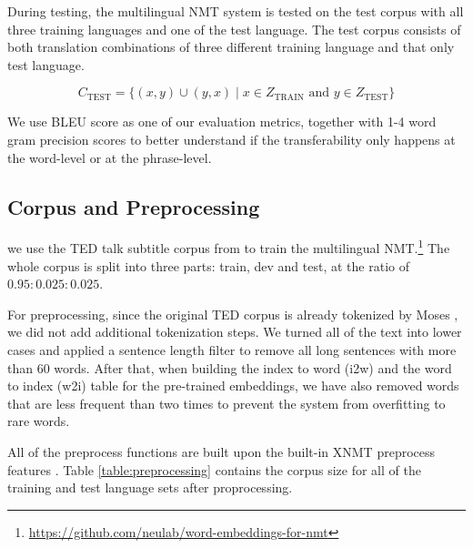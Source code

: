 \documentclass[thesis]{cluu}
\begin{document}
During testing, the multilingual NMT system is tested on the test corpus with all three training languages and one of the test language. The test corpus consists of both translation combinations of three different training language and that only test language.

\begin{equation*}
  C_{\text{TEST}} = \{(x, y)\cup(y,x) \mid x \in Z_{\text{TRAIN}} \text{ and } y \in Z_{\text{TEST}}\}
\end{equation*}

We use BLEU score \parencite{papineni-etal-2002-bleu} as one of our evaluation metrics, together with 1-4 word gram precision scores to better understand if the transferability only happens at the word-level or at the phrase-level.

\subsection{Corpus and Preprocessing}

we use the TED talk subtitle corpus from \textcite{Qi:2018aa} to train the multilingual NMT.\footnote{\url{https://github.com/neulab/word-embeddings-for-nmt}} The whole corpus is split into three parts: train, dev and test, at the ratio of $0.95:0.025:0.025$.

For preprocessing, since the original TED corpus is already tokenized by Moses \parencite{koehn-etal-2007-moses}, we did not add additional tokenization steps. We turned all of the text into lower cases and applied a sentence length filter to remove all long sentences with more than 60 words. After that, when building the index to word (i2w) and the word to index (w2i) table for the pre-trained embeddings, we have also removed words that are less frequent than two times to prevent the system from overfitting to rare words.

All of the preprocess functions are built upon the built-in XNMT preprocess features \parencite{Neubig:2018aa}. Table \ref{table:preprocessing} contains the corpus size for all of the training and test language sets after proprocessing.
\end{document}
